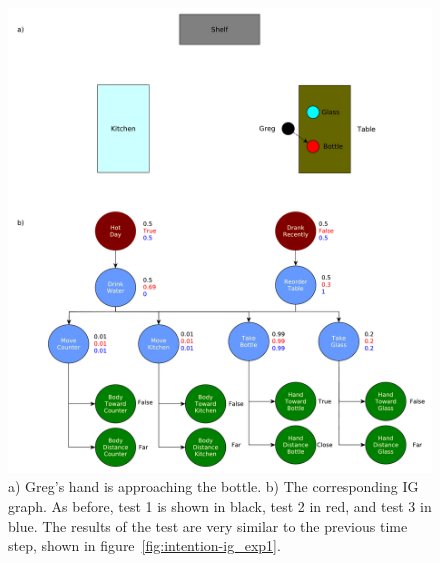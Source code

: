 \clearpage

\hfill
 \begin{figure}[ht!]
	\centering
	\includegraphics[scale=0.4]{img/observer/ig_exp2.pdf}
	\caption[IG Example 2]{a) Greg's hand is approaching the bottle. b) The corresponding IG graph. As before, test 1 is shown in black, test 2 in red, and test 3 in blue. The results of 
	the test are very similar to the previous time step, shown in figure~\ref{fig:intention-ig_exp1}.}
	\label{fig:intention-ig_exp2}
\end{figure}

